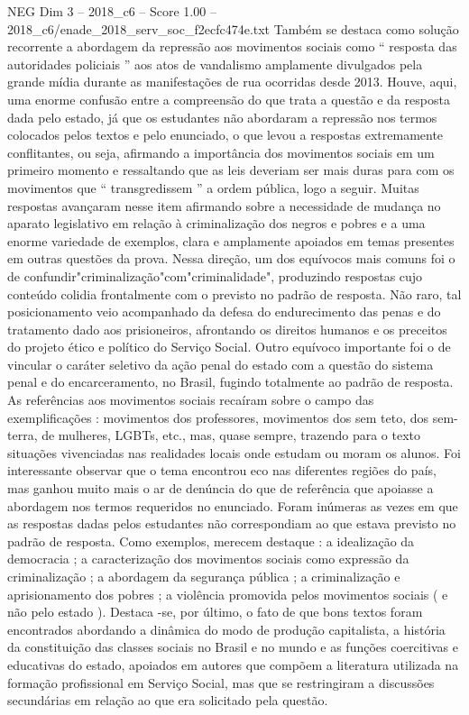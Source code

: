 \begin{textsample}{NEG Dim 3 – 2018\_c6 – Score 1.00 – 2018\_c6/enade\_2018\_serv\_soc\_f2ecfc474e.txt}
Também se destaca como solução recorrente a abordagem da repressão aos movimentos sociais como “ resposta das autoridades policiais ” aos atos de vandalismo amplamente divulgados pela grande mídia durante as manifestações de rua ocorridas desde 2013.
Houve, aqui, uma enorme confusão entre a compreensão do que trata a questão e da resposta dada pelo estado, já que os estudantes não abordaram a repressão nos termos colocados pelos textos e pelo enunciado, o que levou a respostas extremamente conflitantes, ou seja, afirmando a importância dos movimentos sociais em um primeiro momento e ressaltando que as leis deveriam ser mais duras para com os movimentos que “ transgredissem ” a ordem pública, logo a seguir.
Muitas respostas avançaram nesse item afirmando sobre a necessidade de mudança no aparato legislativo em relação à criminalização dos negros e pobres e a uma enorme variedade de exemplos, clara e amplamente apoiados em temas presentes em outras questões da prova.
Nessa direção, um dos equívocos mais comuns foi o de confundir"criminalização"com"criminalidade", produzindo respostas cujo conteúdo colidia frontalmente com o previsto no padrão de resposta.
Não raro, tal posicionamento veio acompanhado da defesa do endurecimento das penas e do tratamento dado aos prisioneiros, afrontando os direitos humanos e os preceitos do projeto ético e político do Serviço Social.
Outro equívoco importante foi o de vincular o caráter seletivo da ação penal do estado com a questão do sistema penal e do encarceramento, no Brasil, fugindo totalmente ao padrão de resposta.
As referências aos movimentos sociais recaíram sobre o campo das exemplificações : movimentos dos professores, movimentos dos sem teto, dos sem-terra, de mulheres, LGBTs, etc., mas, quase sempre, trazendo para o texto situações vivenciadas nas realidades locais onde estudam ou moram os alunos.
Foi interessante observar que o tema encontrou eco nas diferentes regiões do país, mas ganhou muito mais o ar de denúncia do que de referência que apoiasse a abordagem nos termos requeridos no enunciado.
Foram inúmeras as vezes em que as respostas dadas pelos estudantes não correspondiam ao que estava previsto no padrão de resposta.
Como exemplos, merecem destaque : a idealização da democracia ; a caracterização dos movimentos sociais como expressão da criminalização ; a abordagem da segurança pública ; a criminalização e aprisionamento dos pobres ; a violência promovida pelos movimentos sociais ( e não pelo estado ).
Destaca -se, por último, o fato de que bons textos foram encontrados abordando a dinâmica do modo de produção capitalista, a história da constituição das classes sociais no Brasil e no mundo e as funções coercitivas e educativas do estado, apoiados em autores que compõem a literatura utilizada na formação profissional em Serviço Social, mas que se restringiram a discussões secundárias em relação ao que era solicitado pela questão.

\end{textsample}

